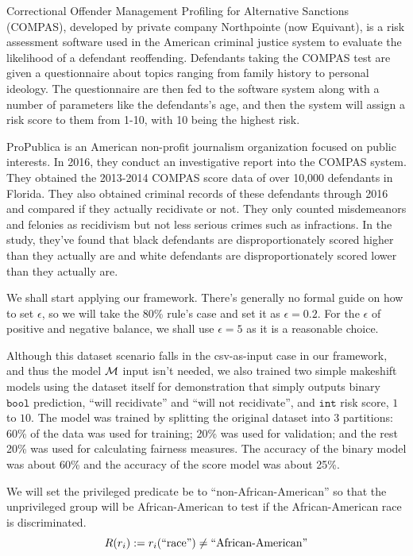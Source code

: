 \documentclass[conference]{IEEEtran}
\begin{document}
Correctional Offender Management Profiling for Alternative Sanctions (COMPAS), developed by private company Northpointe (now Equivant), is a risk assessment software used in the American criminal justice system to evaluate the likelihood of a defendant reoffending. Defendants taking the COMPAS test are given a questionnaire about topics ranging from family history to personal ideology. The questionnaire are then fed to the software system along with a number of parameters like the defendants's age, and then the system will assign a risk score to them from 1-10, with 10 being the highest risk.

ProPublica is an American non-profit journalism organization focused on public interests. In 2016, they conduct an investigative report into the COMPAS system. They obtained the 2013-2014 COMPAS score data of over 10,000 defendants in Florida. They also obtained criminal records of these defendants through 2016 and compared if they actually recidivate or not. They only counted misdemeanors and felonies as recidivism but not less serious crimes such as infractions. In the study, they've found that black defendants are disproportionately scored higher than they actually are and white defendants are disproportionately scored lower than they actually are.

We shall start applying our framework. There's generally no formal guide on how to set $\epsilon$, so we will take the 80\% rule's case and set it as $\epsilon = 0.2$. For the $\epsilon$ of positive and negative balance, we shall use $\epsilon = 5$ as it is a reasonable choice.

Although this dataset scenario falls in the csv-as-input case in our framework, and thus the model $\mathcal{M}$ input isn't needed, we also trained two simple makeshift models using the dataset itself for demonstration that simply outputs binary $\mathtt{bool}$ prediction, ``will recidivate'' and ``will not recidivate'', and $\mathtt{int}$ risk score, $1$ to $10$. The model was trained by splitting the original dataset into 3 partitions: 60\% of the data was used for training; 20\% was used for validation; and the rest 20\% was used for calculating fairness measures. The accuracy of the binary model was about 60\% and the accuracy of the score model was about 25\%.

We will set the privileged predicate be to ``non-African-American'' so that the unprivileged group will be African-American to test if the African-American race is discriminated.
\[
    R(r_i) := r_i(\text{``race''}) \neq \text{``African-American''}
\]
\end{document}
